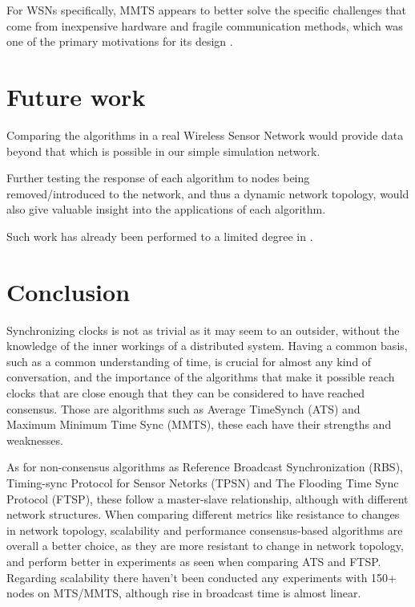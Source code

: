 \documentclass[a4paper,12pt]{article}
\begin{document}
For WSNs specifically, MMTS appears to better solve the specific challenges that come from inexpensive hardware and fragile communication methods, which was one of the primary motivations for its design \cite{HeLiChenCheng13}.

\section{Future work}
Comparing the algorithms in a real Wireless Sensor Network would provide data beyond that which is possible in our simple simulation network.

Further testing the response of each algorithm to nodes being removed/introduced to the network, and thus a dynamic network topology, would also give valuable insight into the applications of each algorithm.

Such work has already been performed to a limited degree in \cite{HeLiChenCheng13}.

\section{Conclusion}
Synchronizing clocks is not as trivial as it may seem to an outsider, without the knowledge of the inner workings of a distributed system. Having a common basis, such as a common understanding of time, is crucial for almost any kind of conversation, and the importance of the algorithms that make it possible reach clocks that are close enough that they can be considered to have reached consensus. Those are algorithms such as Average TimeSynch (ATS) and Maximum Minimum Time Sync (MMTS), these each have their strengths and weaknesses.

As for non-consensus algorithms as Reference Broadcast Synchronization (RBS), Timing-sync Protocol for Sensor Netorks (TPSN) and The Flooding Time Sync Protocol (FTSP), these follow a master-slave relationship, although with different network structures. When comparing different metrics like resistance to changes in network topology, scalability and performance consensus-based algorithms are overall a better choice, as they are more resistant to change in network topology, and perform better in experiments as seen when comparing ATS and FTSP. Regarding scalability there haven't been conducted any experiments with 150+ nodes on MTS/MMTS, although rise in broadcast time is almost linear.
\end{document}
